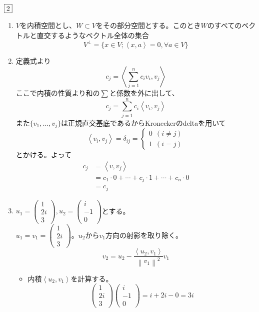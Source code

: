 \documentclass[dvipdfmx]{jsreport}
\newcommand{\norm}[1]{\left\|#1\right\|} %
\newcommand{\innerproduct}[2]{\left\langle{#1}, {#2}\right\rangle}
\newcounter{num}[section]
\begin{document}
\begin{answer} %
	$\fbox{2}$
\begin{enumerate}
	\item $V$を内積空間とし、$W\subset V$をその部分空間とする。このとき$W$のすべてのベクトルと直交するようなベクトル全体の集合
\begin{equation*}
	V^\perp= \{x\in V; \innerproduct{x}{a}= 0, \forall a\in V\}
\end{equation*}

	\item 定義式より
\begin{equation*}
	c_j= \innerproduct{\sum_{j= 1}^n c_iv_i}{v_j}
\end{equation*}
	ここで内積の性質より和の$\sum$と係数を外に出して、
\begin{equation*}
	c_j= \sum_{j= 1}^n c_i\innerproduct{v_i}{v_j}
\end{equation*}
	また$\{v_1, \ldots, v_j\}$は正規直交基底であるからKroneckerのdeltaを用いて
\begin{equation*}
	\innerproduct{v_i}{v_j}= \delta_{ij}= 
	\begin{cases}
		0\ \ (i\ne j)\\
		1\ \ (i= j)
	\end{cases}
\end{equation*}
	とかける。よって
\begin{align*}
	c_j
	&= \innerproduct{v}{v_j}\\
	&= c_1\cdot 0+ \cdots+ c_j\cdot 1+ \cdots+ c_n\cdot 0\\
	&= c_j	
\end{align*}

	\item $u_1= \begin{pmatrix}1\\ 2i\\ 3\end{pmatrix}, u_2= \begin{pmatrix}i\\ -1\\ 0\end{pmatrix}$とする。\\
	$u_1= v_1= \begin{pmatrix}1\\ 2i\\ 3\end{pmatrix}$。$u_2$から$v_1$方向の射影を取り除く。
\begin{equation*}
	v_2= u_2- \frac{\innerproduct{u_2}{v_1}}{\norm{v_1}^2}v_1
\end{equation*}
\begin{itemize}
	\item 内積$\innerproduct{u_2}{v_1}$を計算する。
\begin{equation*}
	\begin{pmatrix}1\\ 2i\\ 3\end{pmatrix}\begin{pmatrix}i\\ -1\\ 0\end{pmatrix}= i+ 2i- 0= 3i
\end{equation*}


\end{itemize}
\end{enumerate}
\end{answer}
\end{document}
